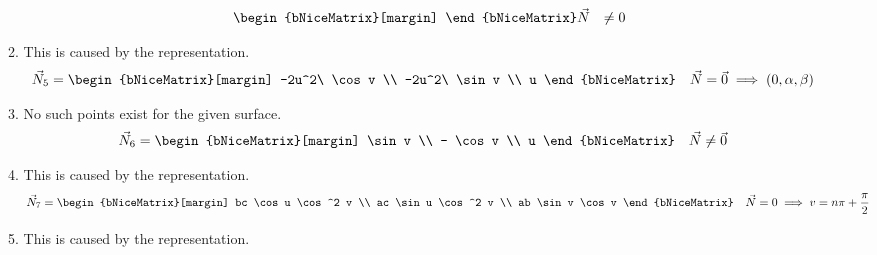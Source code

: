 \begin{enumerate}
\begin{enumerate}
\begin{align}
\begin{bNiceMatrix}[margin]
                        \end{bNiceMatrix} &
                        \vec{N}                     & \neq 0
                    \end{align}
              \item This is caused by the \textcolor{y_p}{representation}.
                    \begin{align}
                        \vec{N}_5                           & =
                        \begin{bNiceMatrix}[margin]
                            -2u^2\ \cos v \\ -2u^2\ \sin v \\ u
                        \end{bNiceMatrix} &
                        \vec{N} = \vec{0}                   & \implies
                        (0, \alpha, \beta)
                    \end{align}
              \item No such points exist for the given surface.
                    \begin{align}
                        \vec{N}_6                   & =
                        \begin{bNiceMatrix}[margin]
                            \sin v \\ - \cos v \\ u
                        \end{bNiceMatrix} &
                        \vec{N}                     & \neq \vec{0}
                    \end{align}
              \item This is caused by the \textcolor{y_p}{representation}.
                    \begin{align}
                        \vec{N}_7                   & =
                        \begin{bNiceMatrix}[margin]
                            bc \cos u \cos^2 v \\
                            ac \sin u \cos^2 v \\
                            ab \sin v \cos v
                        \end{bNiceMatrix} &
                        \vec{N} = 0                 &
                        \implies v = n\pi + \frac{\pi}{2}
                    \end{align}
              \item This is caused by the \textcolor{y_p}{representation}.

\end{enumerate}
\end{enumerate}

